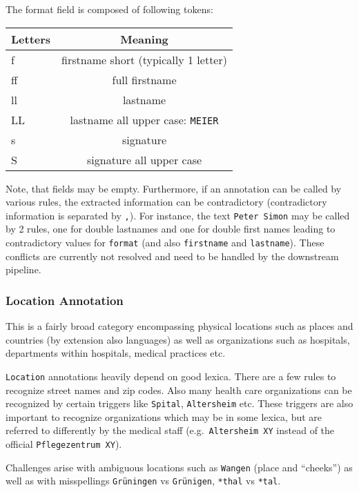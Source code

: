 The format field is composed of following tokens:

\begin{longtable}[]{@{}lc@{}}
\toprule\noalign{}
Letters & Meaning \\
\midrule\noalign{}
\endhead
\bottomrule\noalign{}
\endlastfoot
f & firstname short (typically 1 letter) \\
ff & full firstname \\
ll & lastname \\
LL & lastname all upper case: \texttt{MEIER} \\
s & signature \\
S & signature all upper case \\
\end{longtable}

Note, that fields may be empty. Furthermore, if an annotation can be
called by various rules, the extracted information can be contradictory
(contradictory information is separated by \texttt{,}). For instance,
the text \texttt{Peter\ Simon} may be called by 2 rules, one for double
lastnames and one for double first names leading to contradictory values
for \texttt{format} (and also \texttt{firstname} and \texttt{lastname}).
These conflicts are currently not resolved and need to be handled by the
downstream pipeline.

\subsubsection{Location Annotation}\label{location-annotation}

This is a fairly broad category encompassing physical locations such as
places and countries (by extension also languages) as well as
organizations such as hospitals, departments within hospitals, medical
practices etc.

\texttt{Location} annotations heavily depend on good lexica. There are a
few rules to recognize street names and zip codes. Also many health care
organizations can be recognized by certain triggers like
\texttt{Spital}, \texttt{Altersheim} etc. These triggers are also
important to recognize organizations which may be in some lexica, but
are referred to differently by the medical staff
(e.g.~\texttt{Altersheim\ XY} instead of the official
\texttt{Pflegezentrum\ XY}).

Challenges arise with ambiguous locations such as \texttt{Wangen} (place
and ``cheeks'') as well as with misspellings \texttt{Grüningen} vs
\texttt{Grünigen}, \texttt{*thal} vs \texttt{*tal}.

